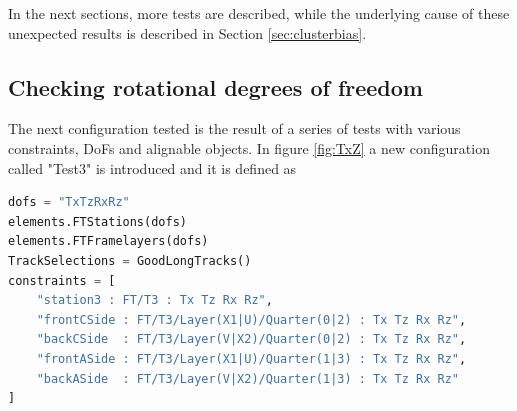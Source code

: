 In the next sections, more tests are described, while the underlying cause of these unexpected results is described in Section \ref{sec:clusterbias}.

\subsection{Checking rotational degrees of freedom}
\label{sec:test_and_c5}
The next configuration tested is the result of a series of tests with various constraints, DoFs and alignable objects. In figure \ref{fig:TxZ} a new configuration called "Test3" is introduced and it is defined as

\begin{lstlisting}[language=Python, basicstyle=\footnotesize]
dofs = "TxTzRxRz"
elements.FTStations(dofs)
elements.FTFramelayers(dofs)
TrackSelections = GoodLongTracks()
constraints = [
    "station3 : FT/T3 : Tx Tz Rx Rz",
    "frontCSide : FT/T3/Layer(X1|U)/Quarter(0|2) : Tx Tz Rx Rz",
    "backCSide  : FT/T3/Layer(V|X2)/Quarter(0|2) : Tx Tz Rx Rz",
    "frontASide : FT/T3/Layer(X1|U)/Quarter(1|3) : Tx Tz Rx Rz",
    "backASide  : FT/T3/Layer(V|X2)/Quarter(1|3) : Tx Tz Rx Rz"
]
\end{lstlisting}

